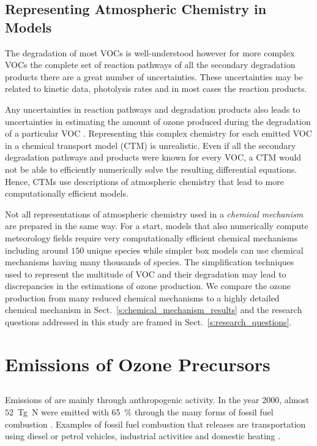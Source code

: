 \subsection{Representing Atmospheric Chemistry in Models} \label{ss:chemistry_models}
The degradation of most VOCs is well-understood however for more complex VOCs the complete set of reaction pathways of all the secondary degradation products there are a great number of uncertainties. 
These uncertainties may be related to kinetic data, photolysis rates and in most cases the reaction products.

Any uncertainties in reaction pathways and degradation products also leads to uncertainties in estimating the amount of ozone produced during the degradation of a particular VOC \citep{Atkinson:2000}.
Representing this complex chemistry for each emitted VOC in a chemical transport model (CTM) is unrealistic.
Even if all the secondary degradation pathways and products were known for every VOC, a CTM would not be able to efficiently numerically solve the resulting differential equations.
Hence, CTMs use descriptions of atmospheric chemistry that lead to more computationally efficient models.

Not all representations of atmospheric chemistry used in a \emph{chemical mechanism} are prepared in the same way.
For a start, models that also numerically compute meteorology fields require very computationally efficient chemical mechanisms including around $150$ unique species while simpler box models can use chemical mechanisms having many thousands of species.
The simplification techniques used to represent the multitude of VOC and their degradation may lead to discrepancies in the estimations of ozone production.
We compare the ozone production from many reduced chemical mechanisms to a highly detailed chemical mechanism in Sect.~\ref{s:chemical_mechanism_results} and the research questions addressed in this study are framed in Sect.~\ref{s:research_questions}.

\section{Emissions of Ozone Precursors} \label{s:precursor_emissions}
\subsection[NOx]{}
Emissions of  are mainly through anthropogenic activity.
In the year 2000, almost $52$~Tg~N were emitted with 65~\% through the many forms of fossil fuel combustion \citep{Seinfeld:2006}. 
Examples of fossil fuel combustion that releases  are transportation using diesel or petrol vehicles, industrial activities and domestic heating \citep{vonSchneidemesser:2015}.

